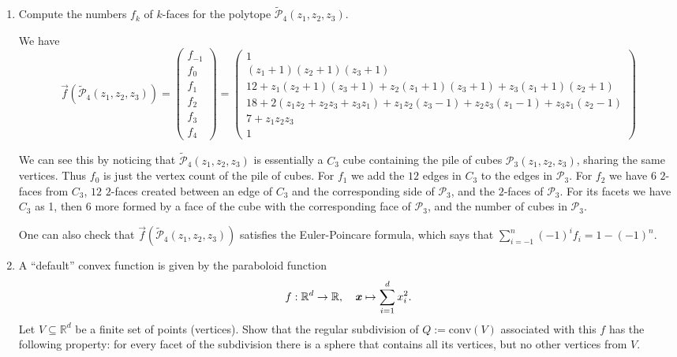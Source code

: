 \documentclass{article}
\begin{document}
\begin{enumerate}
\begin{solution}
    Now assume that $\mathcal{C}(P), \mathcal{C}(Q)$ are regular, then  
\end{solution}

\item Compute the numbers $f_k$ of $k$-faces for the polytope $\widetilde{\mathcal{P}}_4(z_1,z_2,z_3)$.

\begin{solution}
    We have
    \[\vec{f}(\widetilde{\mathcal{P}}_4(z_1,z_2,z_3)) = \begin{pmatrix}
        f_{-1} \\ f_0 \\ f_1 \\ f_2 \\ f_3 \\ f_4
    \end{pmatrix} = \begin{pmatrix}
        1 \\ (z_1+1)(z_2+1)(z_3+1) \\ 12+ z_1(z_2+1)(z_3+1)+z_2(z_1+1)(z_3+1)+z_3(z_1+1)(z_2+1) \\ 18+2(z_1z_2+z_2z_3+z_3z_1) + z_1z_2(z_3-1)+z_2z_3(z_1-1)+ z_3z_1(z_2-1) \\ 7+z_1z_2z_3 \\ 1
    \end{pmatrix}\]

We can see this by noticing that $\widetilde{\mathcal{P}}_4(z_1,z_2,z_3)$ is essentially a $C_3$ cube containing the pile of cubes $\mathcal{P}_3(z_1,z_2,z_3)$, sharing the same vertices. Thus $f_0$ is just the vertex count of the pile of cubes. For $f_1$ we add the $12$ edges in $C_3$ to the edges in $\mathcal{P}_3$. For $f_2$ we have $6$ $2$-faces from $C_3$, $12$ $2$-faces created between an edge of $C_3$ and the corresponding side of $\mathcal{P}_3$, and the $2$-faces of $\mathcal{P}_3$. For its facets we have $C_3$ as 1, then 6 more formed by a face of the cube with the corresponding face of $\mathcal{P}_3$, and the number of cubes in $\mathcal{P}_3$.

One can also check that $\vec{f}(\widetilde{\mathcal{P}}_4(z_1,z_2,z_3))$ satisfies the Euler-Poincare formula, which says that $\sum_{i=-1}^n (-1)^if_i = 1-(-1)^n$.
\end{solution}

\item A ``default'' convex function is given by the paraboloid function
\[
f:\mathbb{R}^d\to\mathbb{R},\quad \textbf{\textit{x}}\mapsto \sum_{i=1}^d x_i^2.
\]
Let $V\subseteq \mathbb{R}^d$ be a finite set of points (vertices). Show that the regular subdivision of $Q:=\mathrm{conv}(V)$ associated with this $f$ has the following property: for every facet of the subdivision there is a sphere that contains all its vertices, but no other vertices from $V$. 


\end{enumerate}
\end{document}
